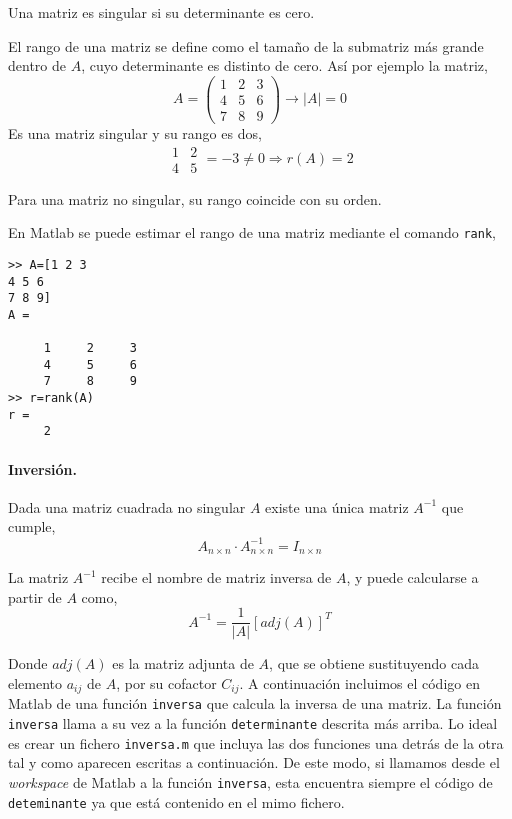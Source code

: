 Una matriz es singular si su determinante es cero.

El rango de una matriz se define como el tamaño de la submatriz más grande dentro de $A$, cuyo determinante es distinto de cero. Así por ejemplo la matriz,
\begin{equation*}
A=\begin{pmatrix}
1& 2& 3\\
4& 5& 6\\
7& 8& 9
\end{pmatrix} \rightarrow \vert A \vert =0
\end{equation*}
Es una matriz singular y su rango es dos,
\begin{equation*}
\begin{matrix}
1& 2\\
4& 5
\end{matrix}=-3 \neq 0 \Rightarrow r(A)=2
\end{equation*}

Para una matriz no singular, su rango coincide con su orden.

En Matlab se puede estimar el rango de una  matriz mediante el comando \texttt{rank},
\begin{verbatim}
>> A=[1 2 3
4 5 6
7 8 9]
A =

     1     2     3
     4     5     6
     7     8     9
>> r=rank(A)
r =
     2
\end{verbatim}

\paragraph{Inversión.} Dada una matriz cuadrada no singular $A$ existe una única matriz $A^{-1}$ que cumple,
\begin{equation*}
A_{n\times n}\cdot A_{n\times n}^{-1}=I_{n\times n}
\end{equation*}

La matriz $A^{-1}$ recibe el nombre de matriz inversa de $A$, y puede calcularse a partir de $A$ como,
\begin{equation*}
A^{-1}=\frac{1}{\vert A \vert}[adj(A)]^T
\end{equation*}

Donde $adj(A)$ es la matriz adjunta de $A$, que se obtiene sustituyendo cada elemento $a_{ij}$ de $A$, por su cofactor $C_{ij}$. A continuación incluimos el código en Matlab de una función \texttt{inversa} que calcula la inversa de una matriz. La función \texttt{inversa} llama a su vez a la función \texttt{determinante} descrita más arriba. Lo ideal es crear un fichero \texttt{inversa.m} que incluya las dos funciones una detrás de la otra tal y como aparecen escritas a continuación. De este modo, si llamamos desde el \emph{workspace} de Matlab a la función \texttt{inversa}, esta encuentra siempre el código de \texttt{deteminante} ya que está contenido en el mimo fichero.

